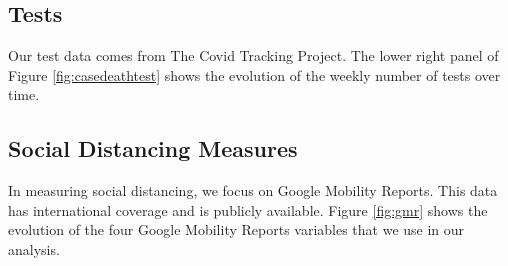 \documentclass[11pt,reqno,letter]{amsart}
\theoremstyle{definition}
\begin{document}
\subsection{Tests}

Our test data comes from The Covid Tracking Project. The lower right panel of Figure
\ref{fig:casedeathtest} shows the evolution of the weekly number of tests over time.


\FloatBarrier

\subsection{Social Distancing Measures}

In measuring social distancing, we focus on Google Mobility
Reports. This data has international coverage and is publicly
available. Figure \ref{fig:gmr} shows the evolution of the four Google
Mobility Reports variables that we use in our analysis.
\end{document}
